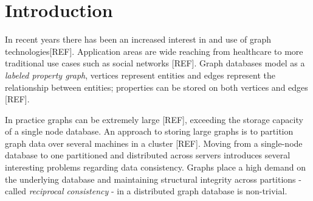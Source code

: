 \documentclass[sigplan,screen]{acmart}
\begin{document}





\maketitle

\section{Introduction}

In recent years there has been an increased interest in and use of graph technologies[REF]. Application areas are wide reaching from healthcare to more traditional use cases such as social networks [REF]. Graph databases model as a \textit{labeled property graph}, vertices represent entities and edges represent the relationship between entities; properties can be stored on both vertices and edges [REF].

In practice graphs can be extremely large [REF], exceeding the storage capacity of a single node database. An approach to storing large graphs is to partition graph data over several machines in a cluster [REF]. Moving from a single-node database to one partitioned and distributed across servers introduces several interesting problems regarding data consistency. Graphs place a high demand on the underlying database and maintaining structural integrity across partitions - called \textit{reciprocal consistency} - in a distributed graph database is non-trivial.
\end{document}
